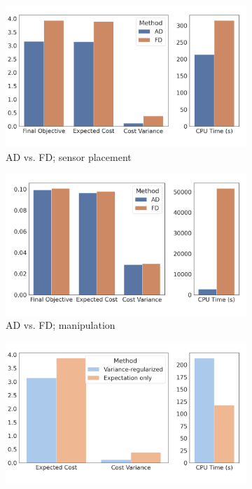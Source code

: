 \begin{figure}[t]
    \centering
    \begin{subfigure}[t]{0.25\linewidth}
        \centering
        \includegraphics[width=\linewidth]{images/ch5/agv_ad_fd_ablation.png}
        \caption{AD vs. FD; sensor placement}
    \end{subfigure}%
    \begin{subfigure}[t]{0.25\linewidth}
        \centering
        \includegraphics[width=\linewidth]{images/ch5/mam_ablation_ad_fd.png}
        \caption{AD vs. FD; manipulation}
    \end{subfigure}%
    \begin{subfigure}[t]{0.25\linewidth}
        \centering
        \includegraphics[width=\linewidth]{images/ch5/agv_vr_ablation.png}

\end{subfigure}
\end{figure}

